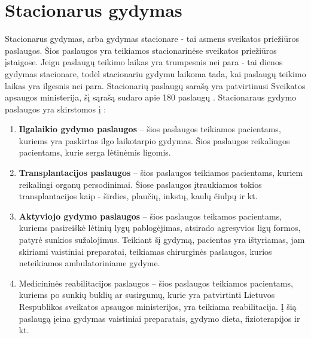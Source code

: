 \section{Stacionarus gydymas}

Stacionarus gydymas, arba gydymas stacionare - tai asmens sveikatos priežiūros paslaugos. Šios paslaugos yra teikiamos stacionarinėse sveikatos priežiūros įstaigose. Jeigu paslaugų teikimo laikas yra trumpesnis nei para - tai dienos gydymas stacionare, todėl stacionariu gydymu laikoma tada, kai paslaugų teikimo laikas yra ilgesnis nei para. Stacionarių paslaugų sarašą yra patvirtinusi Sveikatos apsaugos ministerija, šį sąrašą sudaro apie 180 paslaugų \cite{StacionaroPaslaugos}. Stacionaraus gydymo paslaugos yra skirstomos į \cite{LigoniuKasa}: 
\begin{enumerate}
    \item \textbf{Ilgalaikio gydymo paslaugos} – šios paslaugos teikiamos pacientams, kuriems yra paskirtas ilgo laikotarpio gydymas. Šios paslaugos reikalingos pacientams, kurie serga lėtinėmis ligomis.
    \item \textbf{Transplantacijos paslaugos} – šios paslaugos teikiamos pacientams, kuriem reikalingi organų persodinimai. Šiose paslaugos įtraukiamos tokios transplantacijos kaip - širdies, plaučių, inkstų, kaulų čiulpų ir kt. 
    \item \textbf{Aktyviojo gydymo paslaugos} – šios paslaugos teikamos pacientams, kuriems pasireiškė lėtinių lygų pablogėjimas, atsirado agresyvios ligų formos, patyrė sunkios sužalojimus. Teikiant šį gydymą, pacientas yra ištyriamas, jam skiriami vaistiniai preparatai, teikiamas chirurginės paslaugos, kurios neteikiamos ambulatoriniame gydyme.
    \item Medicininės reabilitacijos paslaugos – šios paslaugos teikiamos pacientams, kuriems po sunkių buklių ar susirgumų, kurie yra patvirtinti Lietuvos Respublikos sveikatos apsaugos ministerijos, yra teikiama reabilitacija. Į šią paslaugą įeina gydymas vaistiniai preparatais, gydymo dieta, fizioterapijos ir kt.
\end{enumerate}





